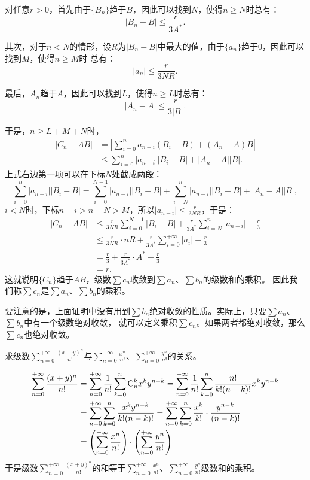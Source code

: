 \documentclass[12pt,UTF8,fontset=none]{ctexbook}
\begin{document}
对任意$r>0$，首先由于$\{B_n\}$趋于$B$，因此可以找到$N$，使得$n\geqslant N$时总有：
$$ |B_n - B| \leqslant \frac{r}{3A^*}. $$

其次，对于$n<N$的情形，设$R$为$|B_n-B|$中最大的值，由于$\{a_n\}$趋于$0$，因此可以找到$M$，使得$n\geqslant M$时
总有：
$$ |a_n| \leqslant \frac{r}{3NR}.$$

最后，$A_n$趋于$A$，因此可以找到$L$，使得$n\geqslant L$时总有：
$$ |A_n - A| \leqslant \frac{r}{3|B|}.$$

于是，$n\geqslant L+M+N$时，
\begin{align*}
    |C_n - AB| &= \left|\sum_{i=0}^{n} a_{n-i} (B_i - B) + (A_n - A) B \right| \\
    &\leqslant  \sum_{i=0}^{n} |a_{n-i} ||B_i - B | + |A_n - A| |B|. 
\end{align*}
上式右边第一项可以在下标$N$处截成两段：
$$ \sum_{i=0}^{n} |a_{n-i} ||B_i - B | = \sum_{i=0}^{N-1} |a_{n-i}| |B_i - B| + \sum_{i=N}^{n} |a_{n-i}| |B_i - B| + |A_n - A| |B|,$$
$i<N$时，下标$n-i > n-N >M$，所以$|a_{n-i}| \leqslant \frac{r}{3NR}$，于是：
\begin{align*}
    |C_n - AB| &\leqslant \frac{r}{3NR} \sum_{i=0}^{N-1} |B_i - B| + \frac{r}{3A^*} \sum_{i=N}^{n} |a_{n-i}| + \frac{r}{3} \\
    &\leqslant \frac{r}{3NR} \cdot nR +  \frac{r}{3A^*} \sum_{i=0}^{+\infty} |a_i| + \frac{r}{3} \\
    &= \frac{r}{3} + \frac{r}{3A^*}\cdot A^* + \frac{r}{3} \\
    &= r.
\end{align*}
这就说明$\{C_n\}$趋于$AB$，级数$\sum c_n$收敛到$\sum a_n$、$\sum b_n$的级数和的乘积。
因此我们称$\sum c_n$是$\sum a_n$、$\sum b_n$的乘积。

要注意的是，上面证明中没有用到$\sum b_n$绝对收敛的性质。实际上，只要$\sum a_n$、$\sum b_n$中有一个级数绝对收敛，
就可以定义乘积$\sum c_n$。如果两者都绝对收敛，那么$\sum c_n$也绝对收敛。

\begin{et}
    求级数$\sum_{n=0}^{+\infty} \frac{(x + y)^n}{n!}$与$\sum_{n=0}^{+\infty} \frac{x^n}{n!}$、$\sum_{n=0}^{+\infty} \frac{y^n}{n!}$的关系。
\end{et}

\begin{so}
    \begin{align*}
        \sum_{n=0}^{+\infty} \frac{(x + y)^n}{n!} &= \sum_{n=0}^{+\infty} \frac{1}{n!}\sum_{k=0}^n \mathrm{C}_{n}^{k} x^k y^{n-k} = \sum_{n=0}^{+\infty} \frac{1}{n!}\sum_{k=0}^n \frac{n!}{k!(n-k)!} x^k y^{n-k} \\
        &= \sum_{n=0}^{+\infty}\sum_{k=0}^n \frac{x^k y^{n-k}}{k!(n-k)!} = \sum_{n=0}^{+\infty}\sum_{k=0}^n \frac{x^k}{k!} \cdot \frac{y^{n-k}}{(n-k)!} \\
        &= \left(\sum_{n=0}^{+\infty} \frac{x^n}{n!} \right)
        \cdot \left(\sum_{n=0}^{+\infty} \frac{y^n}{n!}\right)
    \end{align*}
    于是级数$\sum_{n=0}^{+\infty} \frac{(x + y)^n}{n!}$的和等于$\sum_{n=0}^{+\infty} \frac{x^n}{n!}$、$\sum_{n=0}^{+\infty} \frac{y^n}{n!}$级数和的乘积。
\end{so}
\end{document}
